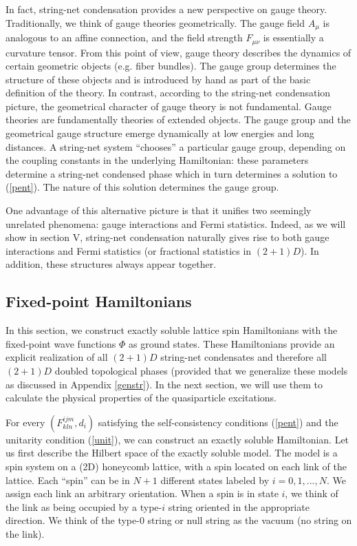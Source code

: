 \documentclass[aps,twocolumn,groupedaddress,showpacs,floatfix]{revtex4}
\begin{document}
In fact, string-net condensation provides a new perspective on gauge theory.
Traditionally, we think of gauge theories geometrically. The gauge field
$A_\mu$ is analogous to an affine connection, and the field strength 
$F_{\mu\nu}$ is essentially a curvature tensor. From this point of view, gauge 
theory describes the dynamics of certain geometric objects (e.g. fiber 
bundles). The gauge group determines the structure of these objects and 
is introduced by hand as part of the basic definition of the theory. 
In contrast, according to the string-net condensation picture, the
geometrical character of gauge theory is not fundamental. Gauge theories are 
fundamentally theories of extended objects. The gauge group and the 
geometrical gauge structure emerge dynamically at low energies and long 
distances. A string-net system ``chooses'' a particular gauge group, depending
on the coupling constants in the underlying Hamiltonian: these parameters
determine a string-net condensed phase which in turn determines a solution to
(\ref{pent}). The nature of this solution determines the gauge group.

One advantage of this alternative picture is that it unifies two seemingly 
unrelated phenomena: gauge interactions and Fermi statistics. Indeed, as we 
will show in section V, string-net condensation naturally gives rise to both 
gauge interactions and Fermi statistics (or fractional statistics in $(2+1)D$).
In addition, these structures always appear together. \cite{LWsta}
 
\subsection{Fixed-point Hamiltonians}

In this section, we construct exactly soluble lattice spin Hamiltonians with
the fixed-point wave functions $\Phi$ as ground states. These Hamiltonians
provide an explicit realization of all $(2+1)D$ string-net condensates and
therefore all $(2+1)D$ doubled topological phases (provided that we generalize
these models as discussed in Appendix \ref{genstr}). In the next section, we 
will use them to calculate the physical properties of the quasiparticle 
excitations.

For every $(F^{ijm}_{kln}, d_i)$ satisfying the self-consistency conditions
(\ref{pent}) and the unitarity condition (\ref{unit}), we can construct an 
exactly soluble Hamiltonian. Let us first describe the Hilbert space of the 
exactly soluble model. The model is a spin system on a (2D) honeycomb lattice, 
with a spin located on each link of the lattice. Each ``spin'' can be in 
$N+1$ different states labeled by $i=0,1,...,N$. We assign each link an 
arbitrary orientation. When a spin is in state $i$, we think of the link 
as being occupied by a type-$i$ string oriented in the appropriate direction. 
We think of the type-$0$ string or null string as the vacuum (\ie no string 
on the link).
\end{document}
